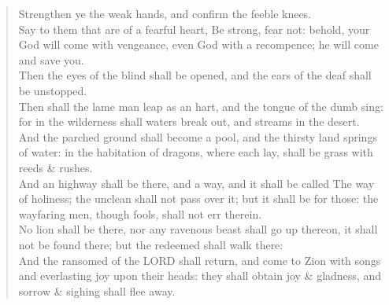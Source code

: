 \documentclass[MAIN]{subfiles}
\begin{document}
\begin{verse}
Strengthen ye the weak hands, and confirm the feeble knees.\\
Say to them that are of a fearful heart, Be strong, fear not: behold, your God will come with vengeance, even God with a recompence; he will come and save you.\\
Then the eyes of the blind shall be opened, and the ears of the deaf shall be unstopped.\\
Then shall the lame man leap as an hart, and the tongue of the dumb sing: for in the wilderness shall waters break out, and streams in the desert.\\
And the parched ground shall become a pool, and the thirsty land springs of water: in the habitation of dragons, where each lay, shall be grass with reeds \& rushes.\\
And an highway shall be there, and a way, and it shall be called The way of holiness; the unclean shall not pass over it; but it shall be for those: the wayfaring men, though fools, shall not err therein.\\
No lion shall be there, nor any ravenous beast shall go up thereon, it shall not be found there; but the redeemed shall walk there:\\
And the ransomed of the {\hge LORD} shall return, and come to {\sc Zion} with songs and everlasting joy upon their heads: they shall obtain joy \& gladness, and sorrow \& sighing shall flee away.
\end{verse}
\end{document}
